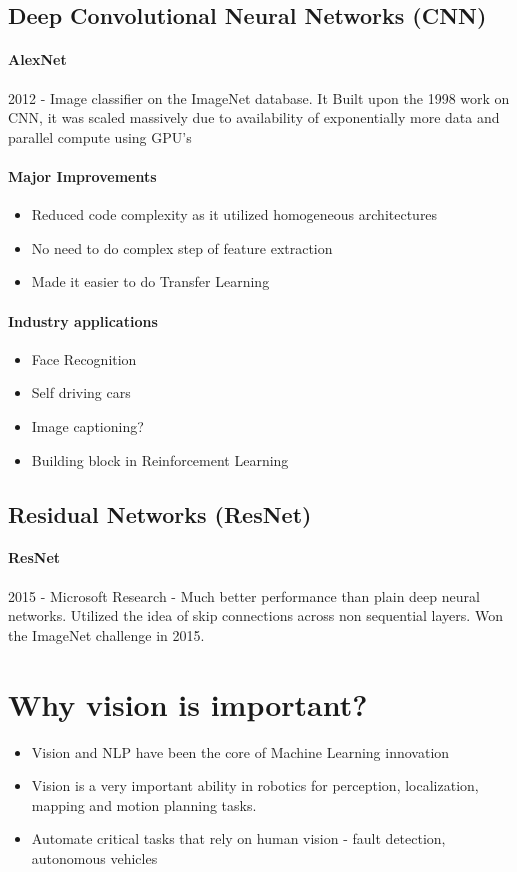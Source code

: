 \documentclass{article}
\begin{document}
	\subsection{Deep Convolutional Neural Networks (CNN)}
		\paragraph{AlexNet}
		2012 - Image classifier on the ImageNet database. It Built upon the 1998 work on CNN, it was scaled massively due to availability of exponentially more data and parallel compute using GPU's
		\paragraph{Major Improvements}
		\begin{itemize}
			\item Reduced code complexity as it utilized homogeneous architectures
			\item No need to do complex step of feature extraction
			\item Made it easier to do Transfer Learning
		\end{itemize}
		\paragraph{Industry applications}
		\begin{itemize}
			\item Face Recognition
			\item Self driving cars
			\item Image captioning?
			\item Building block in Reinforcement Learning
		\end{itemize} 
	
	\subsection{Residual Networks (ResNet)}
		\paragraph{ResNet}
		2015 - Microsoft Research - Much better performance than plain deep neural networks. Utilized the idea of skip connections across non sequential layers. Won the ImageNet challenge in 2015.

	\section{Why vision is important?}
	\begin{itemize}
		\item Vision and NLP have been the core of Machine Learning innovation
		\item Vision is a very important ability in robotics for perception, localization, mapping and motion planning tasks.
		\item Automate critical tasks that rely on human vision - fault detection, autonomous vehicles
	\end{itemize}
\end{document}
